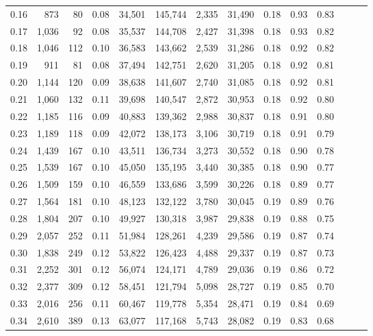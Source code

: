 \begin{tabular}{rrrrrrrrrrrrrr}
0.16 &    873 &   80 &  0.08 &   34,501 &  145,744 &   2,335 &  31,490 &  0.18 &  0.93 &      0.83 \\
0.17 &  1,036 &   92 &  0.08 &   35,537 &  144,708 &   2,427 &  31,398 &  0.18 &  0.93 &      0.82 \\
0.18 &  1,046 &  112 &  0.10 &   36,583 &  143,662 &   2,539 &  31,286 &  0.18 &  0.92 &      0.82 \\
0.19 &    911 &   81 &  0.08 &   37,494 &  142,751 &   2,620 &  31,205 &  0.18 &  0.92 &      0.81 \\
0.20 &  1,144 &  120 &  0.09 &   38,638 &  141,607 &   2,740 &  31,085 &  0.18 &  0.92 &      0.81 \\
0.21 &  1,060 &  132 &  0.11 &   39,698 &  140,547 &   2,872 &  30,953 &  0.18 &  0.92 &      0.80 \\
0.22 &  1,185 &  116 &  0.09 &   40,883 &  139,362 &   2,988 &  30,837 &  0.18 &  0.91 &      0.80 \\
0.23 &  1,189 &  118 &  0.09 &   42,072 &  138,173 &   3,106 &  30,719 &  0.18 &  0.91 &      0.79 \\
0.24 &  1,439 &  167 &  0.10 &   43,511 &  136,734 &   3,273 &  30,552 &  0.18 &  0.90 &      0.78 \\
0.25 &  1,539 &  167 &  0.10 &   45,050 &  135,195 &   3,440 &  30,385 &  0.18 &  0.90 &      0.77 \\
0.26 &  1,509 &  159 &  0.10 &   46,559 &  133,686 &   3,599 &  30,226 &  0.18 &  0.89 &      0.77 \\
0.27 &  1,564 &  181 &  0.10 &   48,123 &  132,122 &   3,780 &  30,045 &  0.19 &  0.89 &      0.76 \\
0.28 &  1,804 &  207 &  0.10 &   49,927 &  130,318 &   3,987 &  29,838 &  0.19 &  0.88 &      0.75 \\
0.29 &  2,057 &  252 &  0.11 &   51,984 &  128,261 &   4,239 &  29,586 &  0.19 &  0.87 &      0.74 \\
0.30 &  1,838 &  249 &  0.12 &   53,822 &  126,423 &   4,488 &  29,337 &  0.19 &  0.87 &      0.73 \\
0.31 &  2,252 &  301 &  0.12 &   56,074 &  124,171 &   4,789 &  29,036 &  0.19 &  0.86 &      0.72 \\
0.32 &  2,377 &  309 &  0.12 &   58,451 &  121,794 &   5,098 &  28,727 &  0.19 &  0.85 &      0.70 \\
0.33 &  2,016 &  256 &  0.11 &   60,467 &  119,778 &   5,354 &  28,471 &  0.19 &  0.84 &      0.69 \\
0.34 &  2,610 &  389 &  0.13 &   63,077 &  117,168 &   5,743 &  28,082 &  0.19 &  0.83 &      0.68 \\

\end{tabular}
